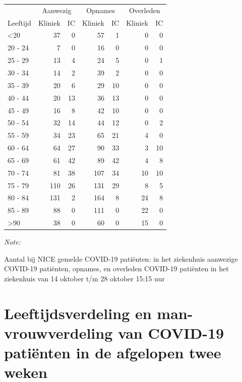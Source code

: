 \documentclass[
  english,
  man,floatsintext]{apa6}
\begin{document}
\begin{table}
\centering\begingroup\fontsize{10}{12}\selectfont

\begin{threeparttable}
\begin{tabular}{lrrrrrr}
\toprule
\multicolumn{1}{c}{ } & \multicolumn{2}{c}{Aanwezig} & \multicolumn{2}{c}{Opnames} & \multicolumn{2}{c}{Overleden} \\
\cmidrule(l{3pt}r{3pt}){2-3} \cmidrule(l{3pt}r{3pt}){4-5} \cmidrule(l{3pt}r{3pt}){6-7}
Leeftijd & Kliniek & IC & Kliniek & IC & Kliniek & IC\\
\midrule
<20 & 37 & 0 & 57 & 1 & 0 & 0\\
20 - 24 & 7 & 0 & 16 & 0 & 0 & 0\\
25 - 29 & 13 & 4 & 24 & 5 & 0 & 1\\
30 - 34 & 14 & 2 & 39 & 2 & 0 & 0\\
35 - 39 & 20 & 6 & 29 & 10 & 0 & 0\\
40 - 44 & 20 & 13 & 36 & 13 & 0 & 0\\
45 - 49 & 16 & 8 & 42 & 10 & 0 & 0\\
50 - 54 & 32 & 14 & 44 & 12 & 0 & 2\\
55 - 59 & 34 & 23 & 65 & 21 & 4 & 0\\
60 - 64 & 64 & 27 & 90 & 33 & 3 & 10\\
65 - 69 & 61 & 42 & 89 & 42 & 4 & 8\\
70 - 74 & 81 & 38 & 107 & 34 & 10 & 10\\
75 - 79 & 110 & 26 & 131 & 29 & 8 & 5\\
80 - 84 & 131 & 2 & 164 & 8 & 24 & 8\\
85 - 89 & 88 & 0 & 111 & 0 & 22 & 0\\
>90 & 38 & 0 & 60 & 0 & 15 & 0\\
\bottomrule
\end{tabular}
\begin{tablenotes}
\item \textit{Note: } 
\item Aantal bij NICE gemelde COVID-19 patiënten: in het ziekenhuis aanwezige COVID-19 patiënten, opnames, en overleden COVID-19 patiënten in het ziekenhuis van 14 oktober t/m 28 oktober 15:15 uur
\end{tablenotes}
\end{threeparttable}
\endgroup{}
\end{table}

\newpage

\hypertarget{leeftijdsverdeling-en-man-vrouwverdeling-van-covid-19-patiuxebnten-in-de-afgelopen-twee-weken}{%
\section{Leeftijdsverdeling en man-vrouwverdeling van COVID-19 patiënten in de afgelopen twee weken}\label{leeftijdsverdeling-en-man-vrouwverdeling-van-covid-19-patiuxebnten-in-de-afgelopen-twee-weken}}
\end{document}
